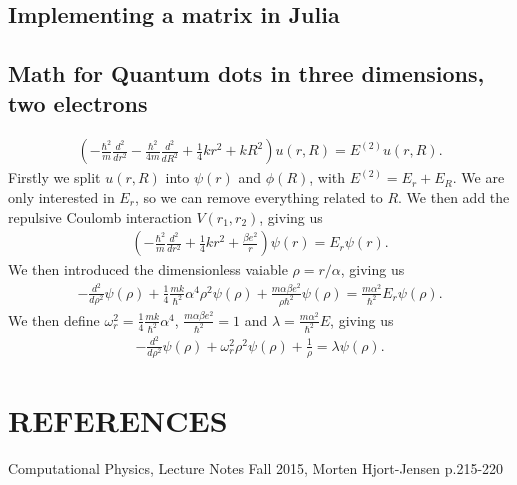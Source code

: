 \documentclass[a4paper]{article}
\begin{document}
\subsection{Implementing a matrix in Julia}\label{opp_d matrix}



\subsection{Math for Quantum dots in three dimensions, two electrons}\label{opp e math}
\begin{align}
\left(  -\frac{\hbar^2}{m} \frac{d^2}{dr^2} -\frac{\hbar^2}{4 m} \frac{d^2}{dR^2}+ \frac{1}{4} k r^2+  kR^2\right)u(r,R)  = E^{(2)} u(r,R).
\end{align}
Firstly we split $u(r,R)$ into  $\psi(r)$ and $\phi(R)$, with $E^{(2)} = E_r + E_R$. We are only interested in $E_r$, so we can remove everything related to $R$. We then add the repulsive Coulomb interaction $V(r_1,r_2)$, giving us
\begin{align}
\left(  -\frac{\hbar^2}{m} \frac{d^2}{dr^2}+ \frac{1}{4}k r^2+\frac{\beta e^2}{r}\right)\psi(r)  = E_r \psi(r).
\end{align}
We then introduced the dimensionless vaiable $\rho = r/\alpha$, giving us
\begin{align}
  -\frac{d^2}{d\rho^2} \psi(\rho) 
+ \frac{1}{4}\frac{mk}{\hbar^2} \alpha^4\rho^2\psi(\rho)+\frac{m\alpha \beta e^2}{\rho\hbar^2}\psi(\rho)  = 
\frac{m\alpha^2}{\hbar^2}E_r \psi(\rho) .
\end{align}
We then define $\omega_r^2=\frac{1}{4}\frac{mk}{\hbar^2} \alpha^4$, $\frac{m\alpha \beta e^2}{\hbar^2}=1$ and $\lambda = \frac{m\alpha^2}{\hbar^2}E$, giving us
\begin{align}
  -\frac{d^2}{d\rho^2} \psi(\rho) + \omega_r^2\rho^2\psi(\rho) +\frac{1}{\rho} = \lambda \psi(\rho).
\end{align}


\section{REFERENCES}
\begin{thebibliography}{9}
	Computational Physics, Lecture Notes Fall 2015, Morten Hjort-Jensen p.215-220
\end{thebibliography}




\end{document}

